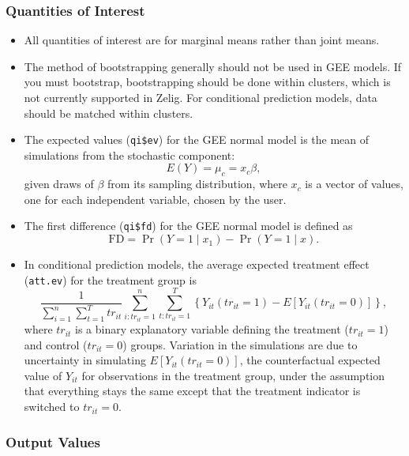 \subsubsection{Quantities of Interest}
\begin{itemize}
\item All quantities of interest are for marginal means rather than joint means.
\item The method of bootstrapping generally should not be used in GEE models.  If you must bootstrap, bootstrapping should be done within clusters, which is not currently supported in Zelig.  For conditional prediction models, data should be matched within clusters.
\item The expected values ({\tt qi\$ev}) for the GEE normal model is the mean of simulations from the stochastic component: $$E(Y) =
  \mu_{c}= x_{c} \beta,$$ given draws of $\beta$ from
  its sampling distribution, where $x_{c}$ is a vector of values, one for
each independent variable, chosen by the user.

\item The first difference ({\tt qi\$fd}) for the GEE normal model is defined as
\begin{equation*}
\textrm{FD} = \Pr(Y = 1 \mid x_1) - \Pr(Y = 1 \mid x).
\end{equation*}

\item In conditional prediction models, the average expected treatment
  effect ({\tt att.ev}) for the treatment group is
    \begin{equation*} \frac{1}{\sum_{i=1}^n \sum_{t=1}^T tr_{it}}\sum_{i:tr_{it}=1}^n \sum_{t:tr_{it}=1}^T \left\{ Y_{it}(tr_{it}=1) -
      E[Y_{it}(tr_{it}=0)] \right\},
    \end{equation*}
    where $tr_{it}$ is a binary explanatory variable defining the treatment
    ($tr_{it}=1$) and control ($tr_{it}=0$) groups.  Variation in the
    simulations are due to uncertainty in simulating $E[Y_{it}(tr_{it}=0)]$,
    the counterfactual expected value of $Y_{it}$ for observations in the
    treatment group, under the assumption that everything stays the
    same except that the treatment indicator is switched to $tr_{it}=0$.

\end{itemize}

\subsubsection{Output Values}

